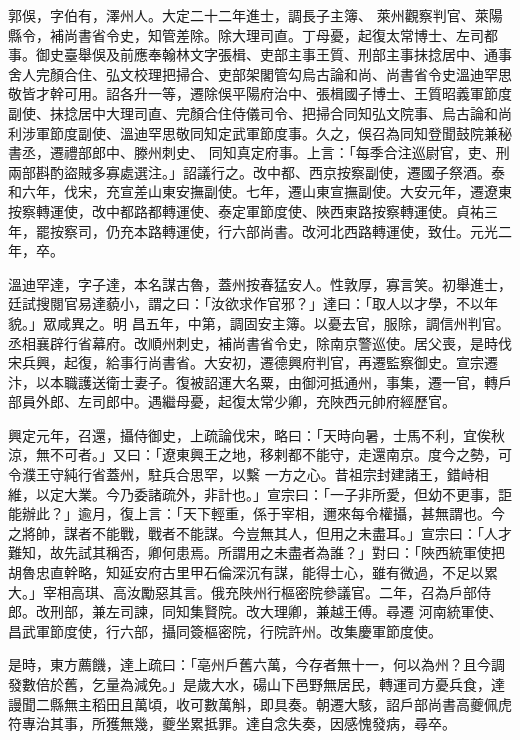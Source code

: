 \begin{pinyinscope}
 郭俁，字伯有，澤州人。大定二十二年進士，調長子主簿、
 萊州觀察判官、萊陽縣令，補尚書省令史，知管差除。除大理司直。丁母憂，起復太常博士、左司都事。御史臺舉俁及前應奉翰林文字張楫、吏部主事王質、刑部主事抹捻居中、通事舍人完顏合住、弘文校理把掃合、吏部架閣管勾烏古論和尚、尚書省令史溫迪罕思敬皆才幹可用。詔各升一等，遷除俁平陽府治中、張楫國子博士、王質昭義軍節度副使、抹捻居中大理司直、完顏合住侍儀司令、把掃合同知弘文院事、烏古論和尚利涉軍節度副使、溫迪罕思敬同知定武軍節度事。久之，俁召為同知登聞鼓院兼秘書丞，遷禮部郎中、滕州刺史、
 同知真定府事。上言：「每季合注巡尉官，吏、刑兩部斟酌盜賊多寡處選注。」詔議行之。改中都、西京按察副使，遷國子祭酒。泰和六年，伐宋，充宣差山東安撫副使。七年，遷山東宣撫副使。大安元年，遷遼東按察轉運使，改中都路都轉運使、泰定軍節度使、陜西東路按察轉運使。貞祐三年，罷按察司，仍充本路轉運使，行六部尚書。改河北西路轉運使，致仕。元光二年，卒。



 溫迪罕達，字子達，本名謀古魯，蓋州按春猛安人。性敦厚，寡言笑。初舉進士，廷試搜閱官易達藐小，謂之曰：「汝欲求作官邪？」達曰：「取人以才學，不以年貌。」眾咸異之。明
 昌五年，中第，調固安主簿。以憂去官，服除，調信州判官。丞相襄辟行省幕府。改順州刺史，補尚書省令史，除南京警巡使。居父喪，是時伐宋兵興，起復，給事行尚書省。大安初，遷德興府判官，再遷監察御史。宣宗遷汴，以本職護送衛士妻子。復被詔運大名粟，由御河抵通州，事集，遷一官，轉戶部員外郎、左司郎中。遇繼母憂，起復太常少卿，充陜西元帥府經歷官。



 興定元年，召還，攝侍御史，上疏論伐宋，略曰：「天時向暑，士馬不利，宜俟秋涼，無不可者。」又曰：「遼東興王之地，移剌都不能守，走還南京。度今之勢，可令濮王守純行省蓋州，駐兵合思罕，以繫
 一方之心。昔祖宗封建諸王，錯峙相維，以定大業。今乃委諸疏外，非計也。」宣宗曰：「一子非所愛，但幼不更事，詎能辦此？」逾月，復上言：「天下輕重，係于宰相，邇來每令權攝，甚無謂也。今之將帥，謀者不能戰，戰者不能謀。今豈無其人，但用之未盡耳。」宣宗曰：「人才難知，故先試其稱否，卿何患焉。所謂用之未盡者為誰？」對曰：「陜西統軍使把胡魯忠直幹略，知延安府古里甲石倫深沉有謀，能得士心，雖有微過，不足以累大。」宰相高琪、高汝勵惡其言。俄充陜州行樞密院參議官。二年，召為戶部侍郎。改刑部，兼左司諫，同知集賢院。改大理卿，兼越王傅。尋遷
 河南統軍使、昌武軍節度使，行六部，攝同簽樞密院，行院許州。改集慶軍節度使。



 是時，東方薦饑，達上疏曰：「亳州戶舊六萬，今存者無十一，何以為州？且今調發數倍於舊，乞量為減免。」是歲大水，碭山下邑野無居民，轉運司方憂兵食，達謾聞二縣無主稻田且萬頃，收可數萬斛，即具奏。朝遷大駭，詔戶部尚書高夔佩虎符專治其事，所獲無幾，夔坐累抵罪。達自念失奏，因感愧發病，尋卒。




\end{pinyinscope}
